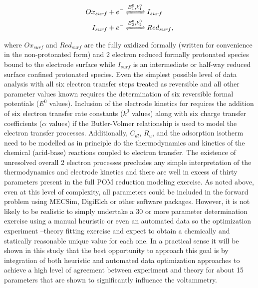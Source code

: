 \documentclass[a4paper, 12pt]{article}
\begin{document}
\begin{align}
    Ox_{surf} + e^- \cee{&<=>[E^0_1,k^0_1]} I_{surf} \label{eq:ox_to_i} \\
    I_{surf} + e^- \cee{&<=>[E^0_2,k^0_2]} Red_{surf}, \label{eq:i_to_red}
\end{align}

where $Ox_{surf}$ and $Red_{surf}$ are the fully oxidized formally 
 (written for convenience in the non-protonated form) and 2 
electron reduced formally protonated  species bound to the 
electrode surface while $I_{surf}$ is an intermediate or half-way reduced 
surface confined  protonated  species. Even the simplest 
possible level of data analysis with all six electron transfer steps treated as 
reversible and all other parameter values known requires the determination of 
six reversible formal potentials ($E^0$ values). Inclusion of the electrode 
kinetics for requires the addition of six electron transfer rate constants  
($k^0$  values) along with six charge transfer coefficients ($\alpha$ values) if 
the Butler-Volmer relationship is used to model the electron transfer processes.  
Additionally, $C_{dl}$, $R_u$, and the adsorption isotherm need to be modelled 
as in principle do the thermodynamics and kinetics of the chemical (acid-base)   
reactions coupled to electron transfer. The existence of unresolved overall 2 
electron processes precludes any simple interpretation of the thermodynamics and 
electrode kinetics and there are well in excess of thirty parameters present in 
the full POM reduction modeling exercise. As noted above, even at this level of 
complexity, all parameters could be included in the forward problem using 
MECSim, DigiElch or other software packages. However, it is not likely to be 
realistic to simply undertake a 30 or more parameter determination exercise 
using a manual heuristic or even an automated data so the optimization 
experiment –theory fitting exercise and expect to obtain a chemically and 
statically reasonable unique value for each one. In a practical sense it will be 
shown in this study that the best opportunity to approach this goal is by 
integration of both heuristic and automated data optimization approaches to 
achieve   a high level of agreement between experiment and theory for about 15 
parameters that are shown to significantly influence the voltammetry.
\end{document}
